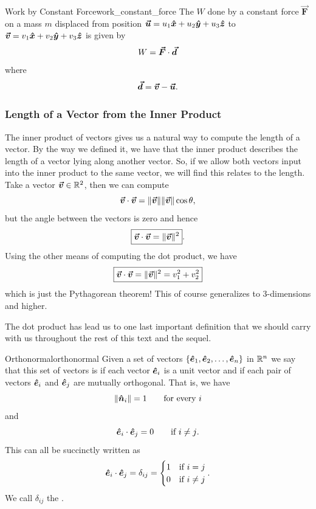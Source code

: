         \begin{ex}{Work by Constant Force}{work_constant_force}
        The  $W$ done by a constant force $\boldsymbol{\vec{F}}$ on a mass $m$ displaced from position $\boldsymbol{\boldsymbol{\vec{u}}}=u_1 \boldsymbol{\hat{x}} + u_2 \boldsymbol{\hat{y}} + u_3\boldsymbol{\hat{z}} $ to $\boldsymbol{\boldsymbol{\vec{v}}} = v_1 \boldsymbol{\hat{x}} + v_2 \boldsymbol{\hat{y}} + v_3 \boldsymbol{\hat{z}}$ is given by
        \[
        W=\boldsymbol{\vec{F}}\cdot \boldsymbol{\vec{d}}
        \]
        where
        \[
        \boldsymbol{\vec{d}}=\boldsymbol{\boldsymbol{\vec{v}}}-\boldsymbol{\boldsymbol{\vec{u}}}.
        \]
        \end{ex}
        
        \subsubsection{Length of a Vector from the Inner Product}
        The inner product of vectors gives us a natural way to compute the length of a vector.  By the way we defined it, we have that the inner product describes the length of a vector lying along another vector.  So, if we allow both vectors input into the inner product to the same vector, we will find this relates to the length. Take a vector $\boldsymbol{\boldsymbol{\vec{v}}} \in \mathbb{R}^2$, then we can compute
        \[
        \boldsymbol{\boldsymbol{\vec{v}}} \cdot \boldsymbol{\boldsymbol{\vec{v}}} = \|\boldsymbol{\boldsymbol{\vec{v}}}\|\|\boldsymbol{\boldsymbol{\vec{v}}}\| \cos \theta,
        \]
        but the angle between the vectors is zero and hence
        \[
        \boxed{\boldsymbol{\boldsymbol{\vec{v}}}\cdot \boldsymbol{\boldsymbol{\vec{v}}} = \|\boldsymbol{\boldsymbol{\vec{v}}}\|^2}.
        \]
        Using the other means of computing the dot product, we have
        \[
        \boxed{\boldsymbol{\boldsymbol{\vec{v}}} \cdot \boldsymbol{\boldsymbol{\vec{v}}} = \|\boldsymbol{\boldsymbol{\vec{v}}}\|^2 = v_1^2 + v_2^2}
        \]
        which is just the Pythagorean theorem!  This of course generalizes to 3-dimensions and higher.
        
        The dot product has lead us to one last important definition that we should carry with us throughout the rest of this text and the sequel.  
        
        \begin{df}{Orthonormal}{orthonormal}
            Given a set of vectors $\{\boldsymbol{\hat{e}}_1,\boldsymbol{\hat{e}}_2,\dots,\boldsymbol{\hat{e}}_n\}$ in $\mathbb{R}^n$ we say that this set of vectors is  if each vector $\boldsymbol{\hat{e}}_i$ is a unit vector and if each pair of vectors $\boldsymbol{\hat{e}}_i$ and $\boldsymbol{\hat{e}}_j$ are mutually orthogonal. That is, we have
            \[
            \|\boldsymbol{\hat{n}}_i\|=1 \qquad \textrm{for every $i$}
            \]
            and
            \[
            \boldsymbol{\hat{e}}_i \cdot \boldsymbol{\hat{e}}_j = 0 \qquad \textrm{if $i\neq j$}.
            \]
            This can all be succinctly written as
            \[
            \boldsymbol{\hat{e}}_i \cdot \boldsymbol{\hat{e}}_j = \delta_{ij} = \begin{cases} 1 & \textrm{if $i=j$}\\ 0 & \textrm{if $i\neq j$}\end{cases}.
            \]
            We call $\delta_{ij}$ the .
        \end{df}
        
